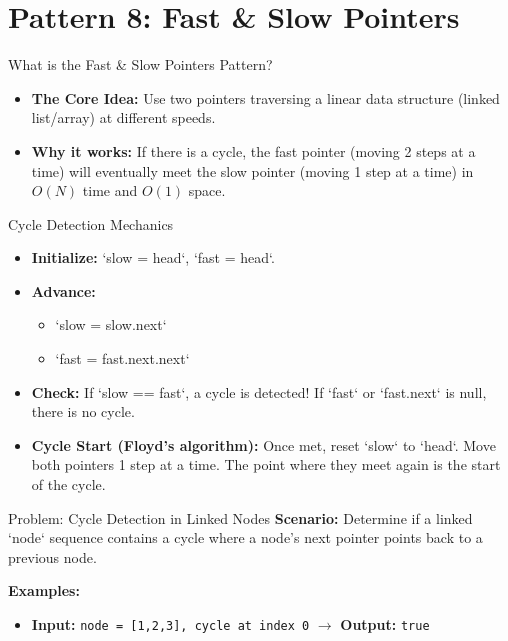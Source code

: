 \section{Pattern 8: Fast \& Slow Pointers}

\begin{frame}[c]{\empty}
    \begin{center}
        \Large\textbf{\secname}
    \end{center}
\end{frame}

\begin{frame}{What is the Fast \& Slow Pointers Pattern?}
  \begin{itemize}
    \item \textbf{The Core Idea:} Use two pointers traversing a linear data structure (linked list/array) at different speeds.
    \item \textbf{Why it works:} If there is a cycle, the fast pointer (moving 2 steps at a time) will eventually meet the slow pointer (moving 1 step at a time) in $O(N)$ time and $O(1)$ space.
  \end{itemize}
\end{frame}

\begin{frame}{Cycle Detection Mechanics}
  \begin{itemize}
    \item \textbf{Initialize:} `slow = head`, `fast = head`.
    \item \textbf{Advance:}
      \begin{itemize}
        \item `slow = slow.next`
        \item `fast = fast.next.next`
      \end{itemize}
    \item \textbf{Check:} If `slow == fast`, a cycle is detected! If `fast` or `fast.next` is null, there is no cycle.
    \item \textbf{Cycle Start (Floyd's algorithm):} Once met, reset `slow` to `head`. Move both pointers 1 step at a time. The point where they meet again is the start of the cycle.
  \end{itemize}
\end{frame}

\begin{frame}[fragile]{Problem: Cycle Detection in Linked Nodes}
  \textbf{Scenario:}
  Determine if a linked `node` sequence contains a cycle where a node's next pointer points back to a previous node.
  
  \vspace{0.3cm}
  \textbf{Examples:}
  \begin{itemize}
    \item \textbf{Input:} \texttt{node = [1,2,3], cycle at index 0} $\rightarrow$ \textbf{Output:} \texttt{true}
  \end{itemize}
\end{frame}

